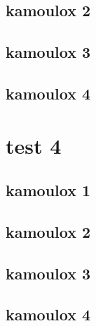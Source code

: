 \documentclass[12pt,a4paper,towside]{book}
\begin{document}
	\section{kamoulox 2}
	\lipsum 
	\section{kamoulox 3}
	\lipsum 
	\section{kamoulox 4}
	\lipsum 

	\chapter{test 4}
	\section{kamoulox 1}
	\lipsum 
	\section{kamoulox 2}
	\lipsum 
	\section{kamoulox 3}
	\lipsum 
	\section{kamoulox 4}
	\lipsum 
%	
%	
%	
	\closeout\glossaireVar
	\appendix

%	
%	
\end{document}
